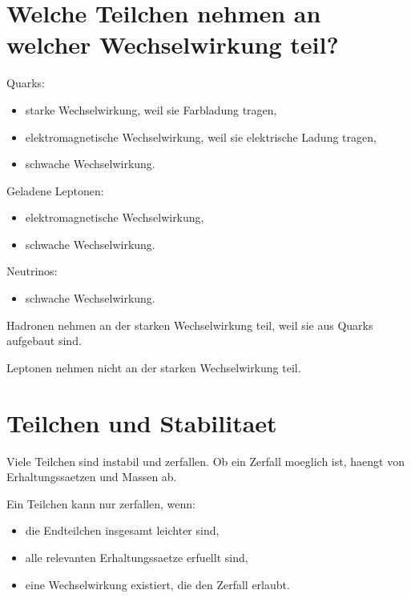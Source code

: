 \section{Welche Teilchen nehmen an welcher Wechselwirkung teil?}

\begin{conceptbox}
Quarks:
\begin{itemize}
    \item starke Wechselwirkung, weil sie Farbladung tragen,
    \item elektromagnetische Wechselwirkung, weil sie elektrische Ladung tragen,
    \item schwache Wechselwirkung.
\end{itemize}

Geladene Leptonen:
\begin{itemize}
    \item elektromagnetische Wechselwirkung,
    \item schwache Wechselwirkung.
\end{itemize}

Neutrinos:
\begin{itemize}
    \item schwache Wechselwirkung.
\end{itemize}
\end{conceptbox}

\begin{notebox}
Hadronen nehmen an der starken Wechselwirkung teil, weil sie aus Quarks aufgebaut
sind.

Leptonen nehmen nicht an der starken Wechselwirkung teil.
\end{notebox}

\section{Teilchen und Stabilitaet}

Viele Teilchen sind instabil und zerfallen.
Ob ein Zerfall moeglich ist, haengt von Erhaltungssaetzen und Massen ab.

\begin{conceptbox}
Ein Teilchen kann nur zerfallen, wenn:
\begin{itemize}
    \item die Endteilchen insgesamt leichter sind,
    \item alle relevanten Erhaltungssaetze erfuellt sind,
    \item eine Wechselwirkung existiert, die den Zerfall erlaubt.
\end{itemize}
\end{conceptbox}

